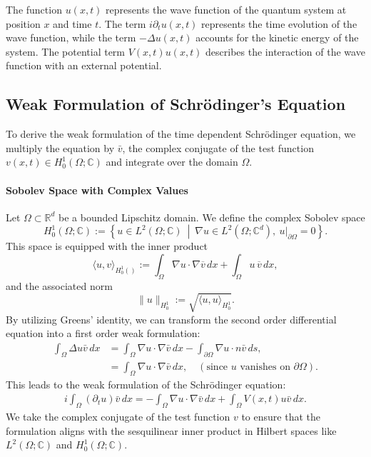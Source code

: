\documentclass{article}
\theoremstyle{definition}
\theoremstyle{plain}
\theoremstyle{remark}
\begin{document}
The function $u(x,t)$ represents the wave function of the quantum system at position $x$ and time $t$. The term $i \partial_t u(x,t)$ represents the time evolution of the wave function, while the term $-\Delta u(x,t)$ accounts for the kinetic energy of the system. The potential term $V(x,t) u(x,t)$ describes the interaction of the wave function with an external potential.

\subsection*{Weak Formulation of Schrödinger's Equation}
To derive the weak formulation of the time dependent Schrödinger equation, we multiply the equation by $\bar{v}$, the complex conjugate of the test function $v(x,t) \in H_0^1(\Omega; \mathbb{C})$ and integrate over the domain $\Omega$. 
\paragraph{Sobolev Space with Complex Values}
Let $\Omega \subset \mathbb{R}^d$ be a bounded Lipschitz domain. We define the complex Sobolev space
\[
H_0^1(\Omega; \mathbb{C}) := \left\{ u \in L^2(\Omega; \mathbb{C}) \ \middle| \ \nabla u \in L^2(\Omega; \mathbb{C}^d), \ u|_{\partial \Omega} = 0 \right\}.
\]
This space is equipped with the inner product
\[
\langle u, v \rangle_{H_0^1()} := \int_\Omega \nabla u \cdot \nabla \overline{v} \, dx + \int_\Omega u \, \overline{v} \, dx,
\]
and the associated norm
\[
\|u\|_{H_0^1} := \sqrt{ \langle u, u \rangle_{H_0^1} }.
\]
By utilizing Greens' identity, we can transform the second order differential equation into a first order weak formulation:
\begin{align*}
  \int_{\Omega} \Delta u \bar{v} \, dx &= \int_{\Omega} \nabla u \cdot \nabla \bar{v} \, dx - \int_{\partial \Omega} \nabla u \cdot n \bar{v} \, ds,\\
  &= \int_{\Omega} \nabla u \cdot \nabla \bar{v} \, dx, \quad (\text{since } u \text{ vanishes on } \partial \Omega).
\end{align*}
This leads to the weak formulation of the Schrödinger equation:
\begin{align*}
    i \int_{\Omega} \left( \partial_t u \right) \bar{v} \, dx = - \int_{\Omega} \nabla u \cdot \nabla \bar{v} \, dx + \int_{\Omega} V(x,t) u \bar{v} \, dx.
\end{align*}
We take the complex conjugate of the test function $v$ to ensure that the formulation aligns with the sesquilinear inner product in Hilbert spaces like $L^2(\Omega; \mathbb{C})$ and $H_0^1(\Omega; \mathbb{C})$.
\end{document}

